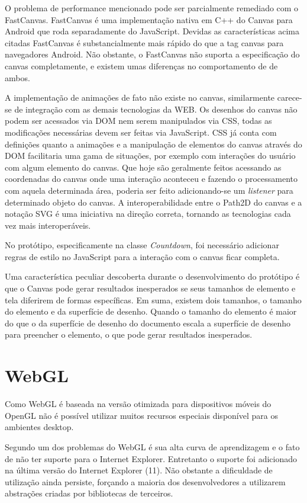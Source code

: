 O problema de performance mencionado pode ser parcialmente remediado
com o FastCanvas. FastCanvas é uma implementação nativa em C++ do
Canvas para Android que roda separadamente do JavaScript. Devidas as
características acima citadas FastCanvas é substancialmente mais
rápido do que a tag canvas para navegadores Android. Não obstante, o
FastCanvas não suporta a especificação do canvas completamente, e
existem umas diferenças no comportamento de de ambos.

A implementação de animações de fato não existe no canvas,
similarmente carece-se de integração com as demais tecnologias
da WEB. Os desenhos do canvas não podem ser acessados via DOM nem
serem manipulados via CSS, todas as modificações necessárias devem
ser feitas via JavaScript. CSS já conta com definições quanto a
animações e a manipulação de elementos do canvas através do DOM
facilitaria uma gama de situações, por exemplo com interações do
usuário com algum elemento do canvas. Que hoje são geralmente feitos
acessando as coordenadas do canvas onde uma interação aconteceu e
fazendo o processamento com aquela determinada área, poderia ser feito
adicionando-se um \textit{listener} para determinado objeto do canvas.
A interoperabilidade entre o Path2D do canvas e a notação SVG é uma iniciativa
na direção correta, tornando as tecnologias cada vez mais interoperáveis.

No protótipo, especificamente na classe \textit{Countdown}, foi necessário
adicionar regras de estilo no JavaScript para  a interação com o canvas
ficar completa.

Uma característica peculiar descoberta durante o desenvolvimento
do protótipo é que o Canvas pode gerar resultados inesperados se
seus tamanhos de elemento e tela diferirem de formas específicas. Em
suma, existem dois tamanhos, o tamanho do elemento e da superfície de
desenho. Quando o tamanho do elemento é maior do que o da superfície
de desenho do documento escala a superfície de desenho para preencher o
elemento, o que pode gerar resultados inesperados.

\section{WebGL}

Como WebGL é baseada na versão otimizada para dispositivos móveis do
OpenGL não é possível utilizar muitos recursos especiais disponível
para os ambientes desktop.

Segundo \cite{html5mostwanted} um dos problemas do WebGL é sua alta
curva de aprendizagem e o fato de não ter suporte para o Internet
Explorer. Entretanto o suporte foi adicionado na última versão do
Internet Explorer (11). Não obstante a dificuldade de utilização
ainda persiste, forçando a maioria dos desenvolvedores a utilizarem
abstrações criadas por bibliotecas de terceiros.

